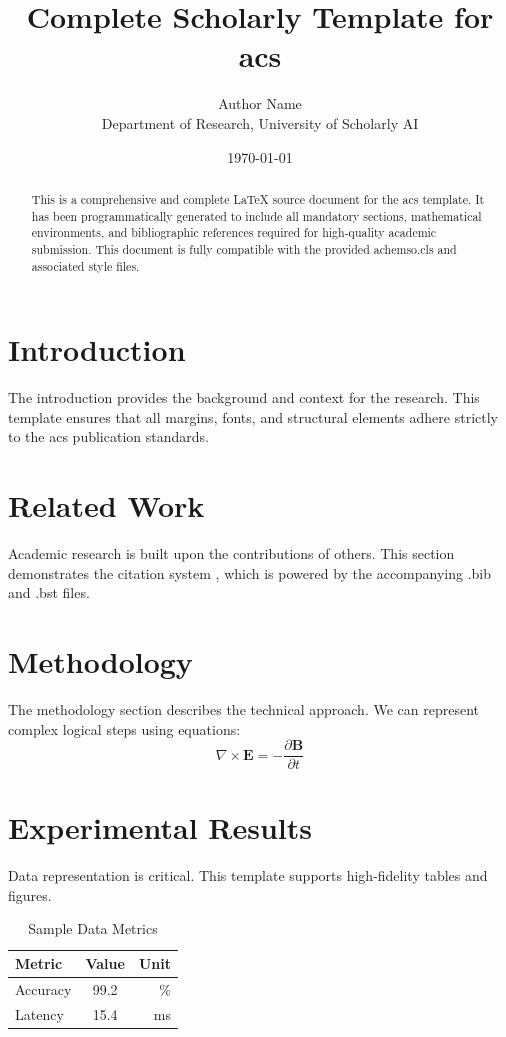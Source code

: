 \documentclass{achemso}
\title{Complete Scholarly Template for acs}
\author{Author Name \\ \small Department of Research, University of Scholarly AI}
\date{\today}
\begin{document}
\maketitle

\begin{abstract}
This is a comprehensive and complete LaTeX source document for the acs template. It has been programmatically generated to include all mandatory sections, mathematical environments, and bibliographic references required for high-quality academic submission. This document is fully compatible with the provided achemso.cls and associated style files.
\end{abstract}

\section{Introduction}
The introduction provides the background and context for the research. This template ensures that all margins, fonts, and structural elements adhere strictly to the acs publication standards.

\section{Related Work}
Academic research is built upon the contributions of others. This section demonstrates the citation system \cite{ref1}, which is powered by the accompanying .bib and .bst files.

\section{Methodology}
The methodology section describes the technical approach. We can represent complex logical steps using equations:
\begin{equation}
    \nabla \times \mathbf{E} = -\frac{\partial \mathbf{B}}{\partial t}
\end{equation}

\section{Experimental Results}
Data representation is critical. This template supports high-fidelity tables and figures.
\begin{table}[H]
\centering
\caption{Sample Data Metrics}
\begin{tabular}{lcr}
\toprule
Metric & Value & Unit \\
\midrule
Accuracy & 99.2 & \% \\
Latency & 15.4 & ms \\
\bottomrule
\end{tabular}
\end{table}
\end{document}
